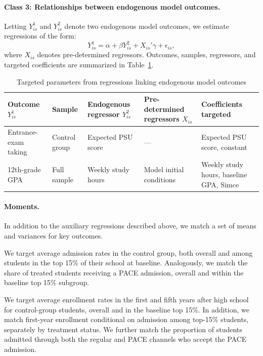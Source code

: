 \paragraph{Class 3: Relationships between endogenous model outcomes.} Letting $Y^1_{is}$ and $Y^2_{is}$ denote two endogenous model outcomes, we estimate regressions of the form:
\begin{equation}
Y^1_{is} = \alpha + \beta Y^2_{is} + X_{is}'\gamma + \epsilon_{is},
\end{equation}
\noindent where $X_{is}$ denotes pre-determined regressors. Outcomes, samples, regressors, and targeted coefficients are summarized in Table~\ref{tab:endo_regs}. \par 


\begin{table}[H]
\centering
\caption{Targeted parameters from regressions linking endogenous model outcomes}
\label{tab:endo_regs}
\begin{tabularx}{\textwidth}{l l X X X}
\toprule
Outcome $Y^1_{is}$
& Sample
& Endogenous regressor $Y^2_{is}$ 
& Pre-determined regressors $X_{is}$ 
& Coefficients targeted \\
\midrule
Entrance-exam taking
& Control group
& Expected PSU score
& ---
& Expected PSU score, constant \\

12th-grade GPA
& Full sample
& Weekly study hours
& Model initial conditions
& Weekly study hours, baseline GPA, Simce \\

\bottomrule
\end{tabularx}
\end{table}




\paragraph{Moments.}
In addition to the auxiliary regressions described above, we match a set of means and variances for key outcomes.

We target average admission rates in the control group, both overall and among students in the top 15\% of their school at baseline. Analogously, we match the share of treated students receiving a PACE admission, overall and within the baseline top 15\% subgroup.\par

We target average enrollment rates in the first and fifth years after high school for control-group students, overall and in the baseline top 15\%. In addition, we match first-year enrollment conditional on admission among top-15\% students, separately by treatment status. We further match the proportion of students admitted through both the regular and PACE channels who accept the PACE admission.\par

